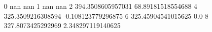 0 nan nan
1 nan nan
2 394.3508605957031 68.89181518554688
4 325.3509216308594 -0.108123779296875
6 325.45904541015625 0.0
8 327.8073425292969 2.348297119140625
